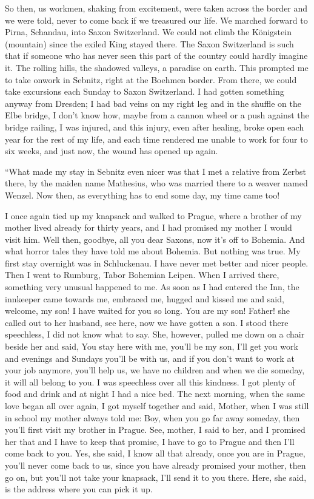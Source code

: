 \documentclass{article}
\begin{document}
So then, us workmen, shaking from excitement, were taken across the border and we were told, never to come back if we treasured our life. We marched forward to Pirna, Schandau, into Saxon Switzerland. We could not climb the Königstein (mountain) since the exiled King stayed there. The Saxon Switzerland is such that if someone who has never seen this part of the country could hardly imagine it. The rolling hills, the shadowed valleys, a paradise on earth. This prompted me to take onwork in Sebnitz, right at the Boehmen border. From there, we could take excursions each Sunday to Saxon Switzerland. I had gotten something anyway from Dresden; I had bad veins on my right leg and in the shuffle on the Elbe bridge, I don't know how, maybe from a cannon wheel or a push against the bridge railing, I was injured, and this injury, even after healing, broke open each year for the rest of my life, and each time rendered me unable to work for four to six weeks, and just now, the wound has opened up again.

``What made my stay in Sebnitz even nicer was that I met a relative from Zerbst there, by the maiden name Mathesius, who was married there to a weaver named Wenzel. Now then, as everything has to end some day, my time came too!

I once again tied up my knapsack and walked to Prague, where a brother of my mother lived already for thirty years, and I had promised my mother I would visit him. Well then, goodbye, all you dear Saxons, now it's off to Bohemia. And what horror tales they have told me about Bohemia. But nothing was true. My first stay overnight was in Schluckenau. I have never met better and nicer people. Then I went to Rumburg, Tabor Bohemian Leipen. When I arrived there, something very unusual happened to me. As soon as I had entered the Inn, the innkeeper came towards me, embraced me, hugged and kissed me and said, welcome, my son! I have waited for you so long. You are my son! Father! she called out to her husband, see here, now we have gotten a son. I stood there speechless, I did not know what to say. She, however, pulled me down on a chair beside her and said, You stay here with me, you'll be my son, I'll get you work and evenings and Sundays you'll be with us, and if you don't want to work at your job anymore, you'll help us, we have no children and when we die someday, it will all belong to you. I was speechless over all this kindness. I got plenty of food and drink and at night I had a nice bed. The next morning, when the same love began all over again, I got myself together and said, Mother, when I was still in school my mother always told me: Boy, when you go far away someday, then you'll first visit my brother in Prague. See, mother, I said to her, and I promised her that and I have to keep that promise, I have to go to Prague and then I'll come back to you. Yes, she said, I know all that already, once you are in Prague, you'll never come back to us, since you have already promised your mother, then go on, but you'll not take your knapsack, I'll send it to you there. Here, she said, is the address where you can pick it up.
\end{document}
